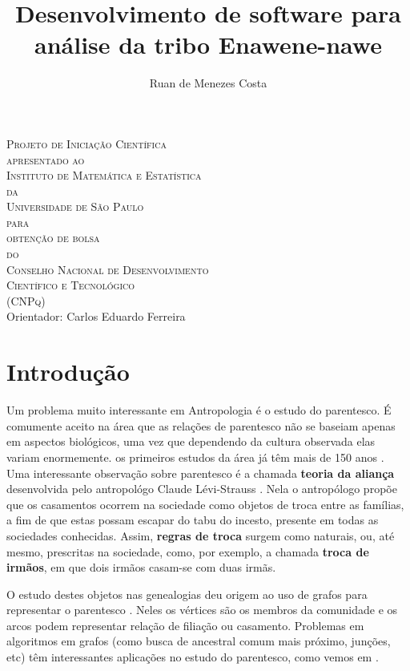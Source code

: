 \documentclass[a4paper,10pt]{article}
\title{{\textbf{Desenvolvimento de software para análise da tribo Enawene-nawe}}}
\author{\LARGE Ruan de Menezes Costa}
\date{}
\begin{document}
\maketitle
\begin{center}

  {\scshape \huge Projeto de Iniciação Científica
	\\apresentado ao
\\Instituto de Matemática e Estatística
	     \\da
    \\Universidade de São Paulo
	    \\para
      \\obtenção de bolsa
	    \\do
\\Conselho Nacional de Desenvolvimento 
     \\Científico e Tecnológico
	   \\(CNPq)}
	   \bigskip
	   \bigskip
	   \bigskip
  \\{\LARGE Orientador: Carlos Eduardo Ferreira}
  
\end{center}
\newpage

\section{Introdução}
Um problema muito interessante em Antropologia é o estudo do
parentesco. É comumente aceito na área que as relações de parentesco
não se baseiam apenas em aspectos biológicos, uma vez que dependendo
da cultura observada elas variam enormemente. os primeiros estudos da
área já têm mais de 150 anos \cite{Morgan}. Uma interessante
observação sobre parentesco é a chamada \textbf{teoria da aliança}
desenvolvida pelo antropológo Claude Lévi-Strauss
\cite{LeviStrauss}. Nela o antropólogo propõe que os casamentos
ocorrem na sociedade como objetos de troca entre as famílias, a fim de
que estas possam escapar do tabu do incesto, presente em todas as
sociedades conhecidas. Assim, \textbf{regras de troca} surgem como
naturais, ou, até mesmo, prescritas na sociedade, como, por exemplo, a
chamada \textbf{troca de irmãos}, em que dois irmãos casam-se com duas
irmãs. 

O estudo destes objetos nas genealogias deu origem ao uso de grafos
para representar o parentesco \cite{Ore}. Neles os vértices são os
membros da comunidade e os arcos podem representar relação de filiação
ou casamento. Problemas em algoritmos em grafos (como
busca de ancestral comum mais próximo, junções, etc) têm interessantes
aplicações no estudo do parentesco, como vemos em \cite{Marcio,
  Alvaro}. 
\end{document}
